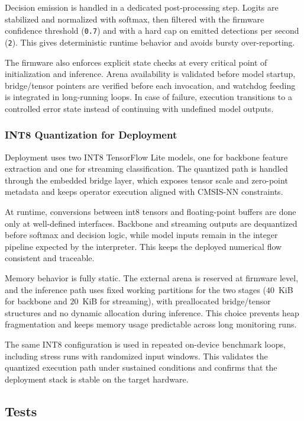 \documentclass[a4paper,singleside,12pt]{report} %
\begin{document}
	Decision emission is handled in a dedicated post-processing step. Logits are stabilized and normalized with softmax, then filtered with the firmware confidence threshold (\texttt{0.7}) and with a hard cap on emitted detections per second (\texttt{2}). This gives deterministic runtime behavior and avoids bursty over-reporting.

	The firmware also enforces explicit state checks at every critical point of initialization and inference. Arena availability is validated before model startup, bridge/tensor pointers are verified before each invocation, and watchdog feeding is integrated in long-running loops. In case of failure, execution transitions to a controlled error state instead of continuing with undefined model outputs.

\subsubsection{INT8 Quantization for Deployment}
	Deployment uses two INT8 TensorFlow Lite models, one for backbone feature extraction and one for streaming classification. The quantized path is handled through the embedded bridge layer, which exposes tensor scale and zero-point metadata and keeps operator execution aligned with CMSIS-NN constraints.

	At runtime, conversions between int8 tensors and floating-point buffers are done only at well-defined interfaces. Backbone and streaming outputs are dequantized before softmax and decision logic, while model inputs remain in the integer pipeline expected by the interpreter. This keeps the deployed numerical flow consistent and traceable.

	Memory behavior is fully static. The external arena is reserved at firmware level, and the inference path uses fixed working partitions for the two stages (\(40\)~KiB for backbone and \(20\)~KiB for streaming), with preallocated bridge/tensor structures and no dynamic allocation during inference. This choice prevents heap fragmentation and keeps memory usage predictable across long monitoring runs.

	The same INT8 configuration is used in repeated on-device benchmark loops, including stress runs with randomized input windows. This validates the quantized execution path under sustained conditions and confirms that the deployment stack is stable on the target hardware.

\subsection{Tests}
\end{document}
